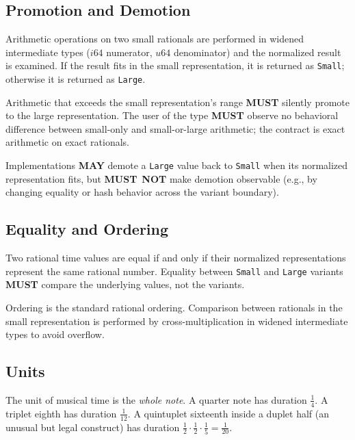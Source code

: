 \documentclass[11pt,letterpaper]{report}
\newcounter{requirement}[chapter]
\newcommand{\MUST}{\textbf{MUST}}
\newcommand{\MUSTNOT}{\textbf{MUST}\nobreak\ \textbf{NOT}}
\newcommand{\MAY}{\textbf{MAY}}
\begin{document}
\subsection{Promotion and Demotion}

Arithmetic operations on two small rationals are performed in widened
intermediate types ($i64$ numerator, $u64$ denominator) and the
normalized result is examined. If the result fits in the small
representation, it is returned as \texttt{Small}; otherwise it is
returned as \texttt{Large}.

\begin{requirement}
  \label{req:time:rational-promotion}
  Arithmetic that exceeds the small representation's range \MUST{}
  silently promote to the large representation. The user of the type
  \MUST{} observe no behavioral difference between small-only and
  small-or-large arithmetic; the contract is exact arithmetic on
  exact rationals.

  Implementations \MAY{} demote a \texttt{Large} value back to
  \texttt{Small} when its normalized representation fits, but
  \MUSTNOT{} make demotion observable (e.g., by changing
  equality or hash behavior across the variant boundary).
\end{requirement}

\subsection{Equality and Ordering}

Two rational time values are equal if and only if their normalized
representations represent the same rational number. Equality between
\texttt{Small} and \texttt{Large} variants \MUST{} compare the
underlying values, not the variants.

Ordering is the standard rational ordering. Comparison between rationals
in the small representation is performed by cross-multiplication in
widened intermediate types to avoid overflow.

\subsection{Units}

The unit of musical time is the \emph{whole note}. A quarter note has
duration $\frac{1}{4}$. A triplet eighth has duration $\frac{1}{12}$.
A quintuplet sixteenth inside a duplet half (an unusual but legal
construct) has duration $\frac{1}{2} \cdot \frac{1}{2} \cdot \frac{1}{5}
= \frac{1}{20}$.
\end{document}
